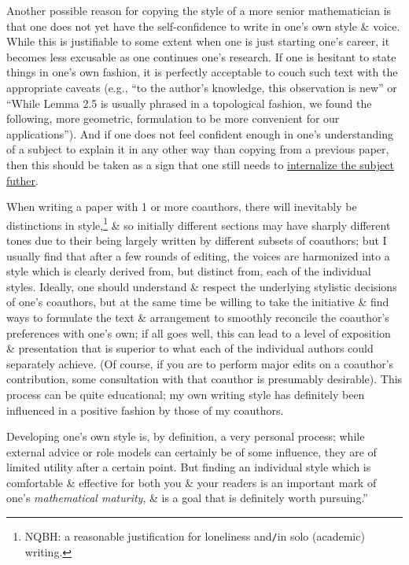 \documentclass[oneside]{book}
\numberwithin{equation}{section}
\begin{document}
Another possible reason for copying the style of a more senior mathematician is that one does not yet have the self-confidence to write in one's own style \& voice. While this is justifiable to some extent when one is just starting one's career, it becomes less excusable as one continues one's research. If one is hesitant to state things in one's own fashion, it is perfectly acceptable to couch such text with the appropriate caveats (e.g., ``to the author's knowledge, this observation is new'' or ``While Lemma 2.5 is usually phrased in a topological fashion, we found the following, more geometric, formulation to be more convenient for our applications''). And if one does not feel confident enough in one's understanding of a subject to explain it in any other way than copying from a previous paper, then this should be taken as a sign that one still needs to \href{https://terrytao.wordpress.com/career-advice/learn-and-relearn-your-field/}{internalize the subject futher}.

When writing a paper with 1 or more coauthors, there will inevitably be distinctions in style,\footnote{NQBH: a reasonable justification for loneliness and\texttt{/}in solo (academic) writing.} \& so initially different sections may have sharply different tones due to their being largely written by different subsets of coauthors; but I usually find that after a few rounds of editing, the voices are harmonized into a style which is clearly derived from, but distinct from, each of the individual styles. Ideally, one should understand \& respect the underlying stylistic decisions of one's coauthors, but at the same time be willing to take the initiative \& find ways to formulate the text \& arrangement to smoothly reconcile the coauthor's preferences with one's own; if all goes well, this can lead to a level of exposition \& presentation that is superior to what each of the individual authors could separately achieve. (Of course, if you are to perform major edits on a coauthor's contribution, some consultation with that coauthor is presumably desirable). This process can be quite educational; my own writing style has definitely been influenced in a positive fashion by those of my coauthors.

Developing one's own style is, by definition, a very personal process; while external advice or role models can certainly be of some influence, they are of limited utility after a certain point. But finding an individual style which is comfortable \& effective for both you \& your readers is an important mark of one's \textit{mathematical maturity}, \& is a goal that is definitely worth pursuing.''
\end{document}
